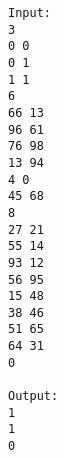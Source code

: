 \begin{verbatim}
Input:
3
0 0
0 1
1 1
6
66 13
96 61
76 98
13 94
4 0
45 68
8
27 21
55 14
93 12
56 95
15 48
38 46
51 65
64 31
0

Output:
1
1
0
\end{verbatim}
